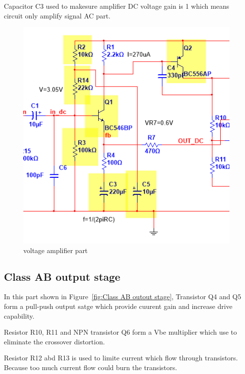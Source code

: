 Capacitor C3 used to makesure amplifier DC voltage gain is 1 which means circuit only amplify signal AC part.

\begin{figure}[htbp]
	\centering
	\includegraphics[scale=0.7]{"../Photo/Chap5/voltage amplifier part"}
	\caption{voltage amplifier part }
	\label{fig:voltage amplifier part}
\end{figure}

\subsection{Class AB output stage}  

In this part shown in Figure~\ref{fig:Class AB outout stage}, Transistor Q4 and Q5 form a pull-push output satge which provide cuurent gain and increase drive capability.

Resistor R10, R11 and NPN transistor Q6 form a Vbe multiplier which use to eliminate the crossover distortion.

Resistor R12 abd R13 is used to limite current which flow through transistors. Because too much current flow could burn the transistors.


